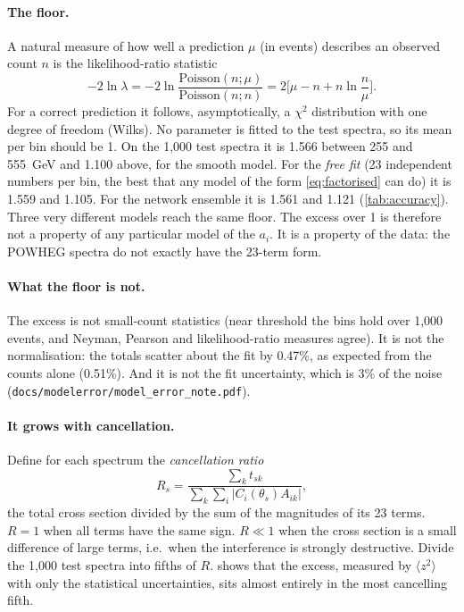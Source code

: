 \documentclass[11pt]{article}
\newcommand{\file}[1]{\nolinkurl{#1}}
\begin{document}
\paragraph{The floor.} A natural measure of how well a prediction $\mu$ (in events) describes
an observed count $n$ is the likelihood-ratio statistic
\begin{equation}
  -2\ln\lambda = -2\ln\frac{\mathrm{Poisson}(n;\mu)}{\mathrm{Poisson}(n;n)}
  = 2\Big[\mu - n + n\ln\frac{n}{\mu}\Big].
\end{equation}
For a correct prediction it follows, asymptotically, a $\chi^2$ distribution with one degree
of freedom (Wilks). No parameter is fitted to the test spectra, so its mean per bin should be 1.
On the 1,000 test spectra it is 1.566 between 255 and 555~GeV and 1.100 above, for the smooth
model. For the \emph{free fit} (23 independent numbers per bin, the best that any model of the
form \cref{eq:factorised} can do) it is 1.559 and 1.105. For the network ensemble it is 1.561
and 1.121 (\cref{tab:accuracy}). Three very different models reach the same floor. The excess
over 1 is therefore not a property of any particular model of the $a_i$. It is a property of
the data: the POWHEG spectra do not exactly have the 23-term form.

\paragraph{What the floor is not.} The excess is not small-count statistics (near threshold the
bins hold over 1,000 events, and Neyman, Pearson and likelihood-ratio measures agree). It is
not the normalisation: the totals scatter about the fit by 0.47\%, as expected from the counts
alone (0.51\%). And it is not the fit uncertainty, which is 3\% of the noise
(\file{docs/modelerror/model_error_note.pdf}).

\paragraph{It grows with cancellation.} Define for each spectrum the \emph{cancellation
ratio}
\begin{equation}
  R_s = \frac{\sum_k t_{sk}}{\sum_k\sum_i |C_i(\theta_s)A_{ik}|} ,
  \label{eq:ratio}
\end{equation}
the total cross section divided by the sum of the magnitudes of its 23 terms. $R = 1$ when
all terms have the same sign. $R \ll 1$ when the cross section is a small difference of
large terms, i.e.\ when the interference is strongly destructive. Divide the 1,000 test
spectra into fifths of $R$.  shows that the excess, measured by
$\langle z^2\rangle$ with only the statistical uncertainties, sits almost entirely in the most
cancelling fifth.
\end{document}
